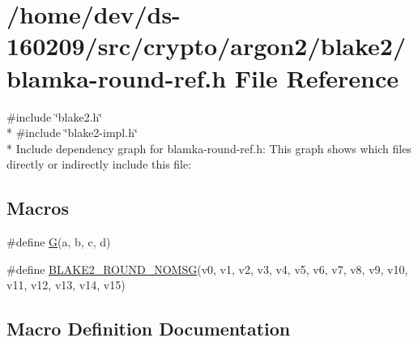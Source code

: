 \hypertarget{blamka-round-ref_8h}{}\section{/home/dev/ds-\/160209/src/crypto/argon2/blake2/blamka-\/round-\/ref.h File Reference}
\label{blamka-round-ref_8h}
{\ttfamily \#include \char`\"{}blake2.\+h\char`\"{}}\\*
{\ttfamily \#include \char`\"{}blake2-\/impl.\+h\char`\"{}}\\*
Include dependency graph for blamka-\/round-\/ref.h\+:
This graph shows which files directly or indirectly include this file\+:
\subsection*{Macros}
\begin{DoxyCompactItemize}
\item 
\#define \hyperlink{blamka-round-ref_8h_a4770411521cb86ce3f7758c3d73d018b}{G}(a,  b,  c,  d)
\item 
\#define \hyperlink{blamka-round-ref_8h_a454fab5e1df1ce9be6cc153331c4958a}{B\+L\+A\+K\+E2\+\_\+\+R\+O\+U\+N\+D\+\_\+\+N\+O\+M\+S\+G}(v0,  v1,  v2,  v3,  v4,  v5,  v6,  v7,  v8,  v9,  v10,  v11, v12,  v13,  v14,  v15)
\end{DoxyCompactItemize}


\subsection{Macro Definition Documentation}
\hypertarget{blamka-round-ref_8h_a454fab5e1df1ce9be6cc153331c4958a}{}
